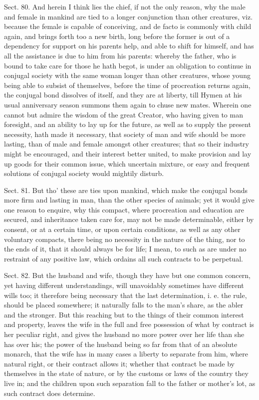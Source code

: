 \documentclass[11pt,openany]{book}
\begin{document}
Sect. 80. And herein I think lies the chief, if not the only reason, why the male and female in mankind are tied to a longer conjunction than other creatures, viz. because the female is capable of conceiving, and de facto is commonly with child again, and brings forth too a new birth, long before the former is out of a dependency for support on his parents help, and able to shift for himself, and has all the assistance is due to him from his parents: whereby the father, who is bound to take care for those he hath begot, is under an obligation to continue in conjugal society with the same woman longer than other creatures, whose young being able to subsist of themselves, before the time of procreation returns again, the conjugal bond dissolves of itself, and they are at liberty, till Hymen at his usual anniversary season summons them again to chuse new mates. Wherein one cannot but admire the wisdom of the great Creator, who having given to man foresight, and an ability to lay up for the future, as well as to supply the present necessity, hath made it necessary, that society of man and wife should be more lasting, than of male and female amongst other creatures; that so their industry might be encouraged, and their interest better united, to make provision and lay up goods for their common issue, which uncertain mixture, or easy and frequent solutions of conjugal society would mightily disturb.

Sect. 81. But tho' these are ties upon mankind, which make the conjugal bonds more firm and lasting in man, than the other species of animals; yet it would give one reason to enquire, why this compact, where procreation and education are secured, and inheritance taken care for, may not be made determinable, either by consent, or at a certain time, or upon certain conditions, as well as any other voluntary compacts, there being no necessity in the nature of the thing, nor to the ends of it, that it should always be for life; I mean, to such as are under no restraint of any positive law, which ordains all such contracts to be perpetual.

Sect. 82. But the husband and wife, though they have but one common concern, yet having different understandings, will unavoidably sometimes have different wills too; it therefore being necessary that the last determination, i. e. the rule, should be placed somewhere; it naturally falls to the man's share, as the abler and the stronger. But this reaching but to the things of their common interest and property, leaves the wife in the full and free possession of what by contract is her peculiar right, and gives the husband no more power over her life than she has over his; the power of the husband being so far from that of an absolute monarch, that the wife has in many cases a liberty to separate from him, where natural right, or their contract allows it; whether that contract be made by themselves in the state of nature, or by the customs or laws of the country they live in; and the children upon such separation fall to the father or mother's lot, as such contract does determine.
\end{document}

